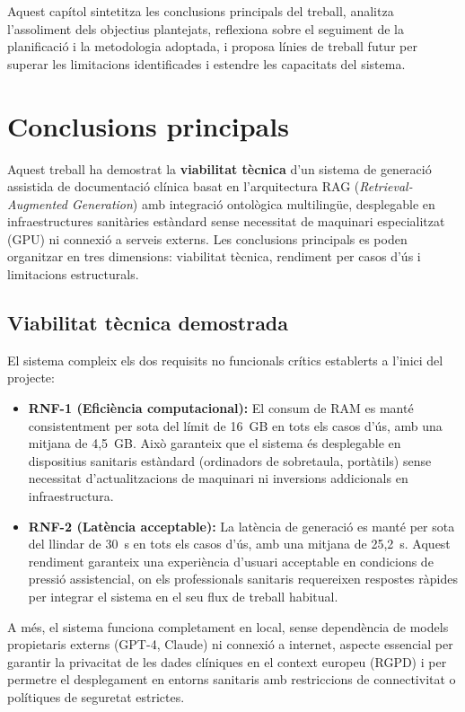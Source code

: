 \documentclass[CAT]{TFUOC}%
\begin{document}
Aquest capítol sintetitza les conclusions principals del treball, analitza l'assoliment dels objectius plantejats, reflexiona sobre el seguiment de la planificació i la metodologia adoptada, i proposa línies de treball futur per superar les limitacions identificades i estendre les capacitats del sistema.

\section{Conclusions principals}

Aquest treball ha demostrat la \textbf{viabilitat tècnica} d'un sistema de generació assistida de documentació clínica basat en l'arquitectura RAG (\textit{Retrieval-Augmented Generation}) amb integració ontològica multilingüe, desplegable en infraestructures sanitàries estàndard sense necessitat de maquinari especialitzat (GPU) ni connexió a serveis externs. Les conclusions principals es poden organitzar en tres dimensions: viabilitat tècnica, rendiment per casos d'ús i limitacions estructurals.

\subsection{Viabilitat tècnica demostrada}

El sistema compleix els dos requisits no funcionals crítics establerts a l'inici del projecte:

\begin{itemize}
    \item \textbf{RNF-1 (Eficiència computacional):} El consum de RAM es manté consistentment per sota del límit de 16~GB en tots els casos d'ús, amb una mitjana de 4,5~GB. Això garanteix que el sistema és desplegable en dispositius sanitaris estàndard (ordinadors de sobretaula, portàtils) sense necessitat d'actualitzacions de maquinari ni inversions addicionals en infraestructura.
    
    \item \textbf{RNF-2 (Latència acceptable):} La latència de generació es manté per sota del llindar de 30~s en tots els casos d'ús, amb una mitjana de 25,2~s. Aquest rendiment garanteix una experiència d'usuari acceptable en condicions de pressió assistencial, on els professionals sanitaris requereixen respostes ràpides per integrar el sistema en el seu flux de treball habitual.
\end{itemize}

A més, el sistema funciona completament en local, sense dependència de models propietaris externs (GPT-4, Claude) ni connexió a internet, aspecte essencial per garantir la privacitat de les dades clíniques en el context europeu (RGPD) i per permetre el desplegament en entorns sanitaris amb restriccions de connectivitat o polítiques de seguretat estrictes.
\end{document}
